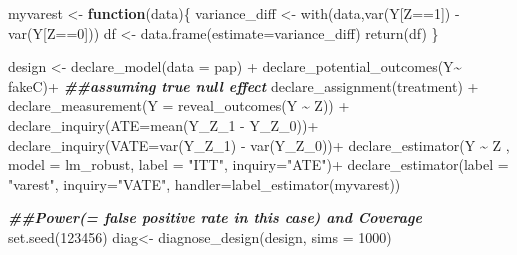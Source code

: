 \documentclass[
  11pt,
]{article}
\newenvironment{Shaded}{\begin{snugshade}}{\end{snugshade}}
\newcommand{\AttributeTok}[1]{\textcolor[rgb]{0.77,0.63,0.00}{#1}}
\newcommand{\ControlFlowTok}[1]{\textcolor[rgb]{0.13,0.29,0.53}{\textbf{#1}}}
\newcommand{\DecValTok}[1]{\textcolor[rgb]{0.00,0.00,0.81}{#1}}
\newcommand{\DocumentationTok}[1]{\textcolor[rgb]{0.56,0.35,0.01}{\textbf{\textit{#1}}}}
\newcommand{\FunctionTok}[1]{\textcolor[rgb]{0.00,0.00,0.00}{#1}}
\newcommand{\NormalTok}[1]{#1}
\newcommand{\OtherTok}[1]{\textcolor[rgb]{0.56,0.35,0.01}{#1}}
\newcommand{\SpecialCharTok}[1]{\textcolor[rgb]{0.00,0.00,0.00}{#1}}
\newcommand{\StringTok}[1]{\textcolor[rgb]{0.31,0.60,0.02}{#1}}
\begin{document}
\begin{Shaded}
\begin{Highlighting}[]
\NormalTok{myvarest }\OtherTok{\textless{}{-}} \ControlFlowTok{function}\NormalTok{(data)\{}
\NormalTok{variance\_diff }\OtherTok{\textless{}{-}} \FunctionTok{with}\NormalTok{(data,}\FunctionTok{var}\NormalTok{(Y[Z}\SpecialCharTok{==}\DecValTok{1}\NormalTok{]) }\SpecialCharTok{{-}} \FunctionTok{var}\NormalTok{(Y[Z}\SpecialCharTok{==}\DecValTok{0}\NormalTok{]))}
\NormalTok{df }\OtherTok{\textless{}{-}} \FunctionTok{data.frame}\NormalTok{(}\AttributeTok{estimate=}\NormalTok{variance\_diff)}
\FunctionTok{return}\NormalTok{(df)}
\NormalTok{\}  }

\NormalTok{design }\OtherTok{\textless{}{-}}
  \FunctionTok{declare\_model}\NormalTok{(}\AttributeTok{data =}\NormalTok{ pap) }\SpecialCharTok{+}
  \FunctionTok{declare\_potential\_outcomes}\NormalTok{(Y}\SpecialCharTok{\textasciitilde{}}\NormalTok{ fakeC)}\SpecialCharTok{+}  \DocumentationTok{\#\#assuming true null effect}
  \FunctionTok{declare\_assignment}\NormalTok{(treatment) }\SpecialCharTok{+} 
  \FunctionTok{declare\_measurement}\NormalTok{(}\AttributeTok{Y =} \FunctionTok{reveal\_outcomes}\NormalTok{(Y }\SpecialCharTok{\textasciitilde{}}\NormalTok{ Z)) }\SpecialCharTok{+}
  \FunctionTok{declare\_inquiry}\NormalTok{(}\AttributeTok{ATE=}\FunctionTok{mean}\NormalTok{(Y\_Z\_1 }\SpecialCharTok{{-}}\NormalTok{ Y\_Z\_0))}\SpecialCharTok{+}
  \FunctionTok{declare\_inquiry}\NormalTok{(}\AttributeTok{VATE=}\FunctionTok{var}\NormalTok{(Y\_Z\_1) }\SpecialCharTok{{-}} \FunctionTok{var}\NormalTok{(Y\_Z\_0))}\SpecialCharTok{+}
  \FunctionTok{declare\_estimator}\NormalTok{(Y }\SpecialCharTok{\textasciitilde{}}\NormalTok{ Z , }\AttributeTok{model =}\NormalTok{ lm\_robust, }\AttributeTok{label =} \StringTok{"ITT"}\NormalTok{, }\AttributeTok{inquiry=}\StringTok{"ATE"}\NormalTok{)}\SpecialCharTok{+}
  \FunctionTok{declare\_estimator}\NormalTok{(}\AttributeTok{label =} \StringTok{"varest"}\NormalTok{, }\AttributeTok{inquiry=}\StringTok{"VATE"}\NormalTok{, }\AttributeTok{handler=}\FunctionTok{label\_estimator}\NormalTok{(myvarest)) }

\DocumentationTok{\#\#Power(= false positive rate in this case) and Coverage}
\FunctionTok{set.seed}\NormalTok{(}\DecValTok{123456}\NormalTok{)}
\NormalTok{diag}\OtherTok{\textless{}{-}} \FunctionTok{diagnose\_design}\NormalTok{(design, }\AttributeTok{sims =} \DecValTok{1000}\NormalTok{)}


\end{Highlighting}
\end{Shaded}
\end{document}
